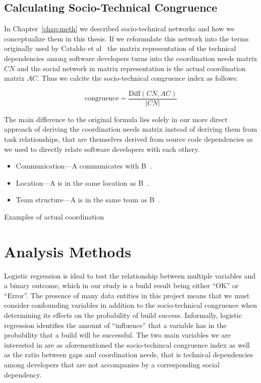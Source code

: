 \subsection{Calculating Socio-Technical Congruence}
\label{sec:stc}
In Chapter~\ref{chap:meth} we described socio-technical networks and how we conceptualize them in this thesis.
If we reformulate this network into the terms originally used by Cataldo et al~\cite{cataldo:cscw:2006} the matrix representation of the technical dependencies among software developers turns into the coordination needs matrix $CN$ and the social network in matrix representation is the actual coordination matrix $AC$.
Thus we calcite the socio-technical congruence index as follows:

\[ \text{congruence} = \frac{\text{Diff}(CN, AC)}  {|CN|} \]

The main difference to the original formula lies solely in our more direct approach of deriving the coordination needs matrix instead of deriving them from task relationships, that are themselves derived from source code dependencies as we used to directly relate software developers with each othery.

\begin{placeholder}[t]
\begin{itemize}
\item Communication---A communicates with B~\cite{cataldo:cscw:2006, ehrlich:stc:2008, cataldo:esem:2008,damian2007:collaboration}.
\item Location---A is in the same location as B~\cite{cataldo:cscw:2006, ehrlich:stc:2008}.
\item Team structure---A is in the same team as B~\cite{cataldo:cscw:2006}.
\end{itemize}
\caption{Examples of actual coordination}
\label{ph:relationships}
\end{placeholder}


\section{Analysis Methods}
\label{sec:methodology}
Logistic regression is ideal to test the relationship between multiple variables and a binary outcome, which in our study is a build result being either ``OK'' or ``Error''. The presence of many data entities in this project means that we must consider confounding variables in addition to the socio-technical congruence when determining its effects on the probability of build success. Informally, logistic regression identifies the amount of ``influence'' that a variable has in the probability that a build will be successful.
The two main variables we are interested in are as aforementioned the socio-techincal congruence index as well as the ratio between gaps and coordination needs, that is technical dependencies among developers that are not accompanies by a corresponding social dependency.

